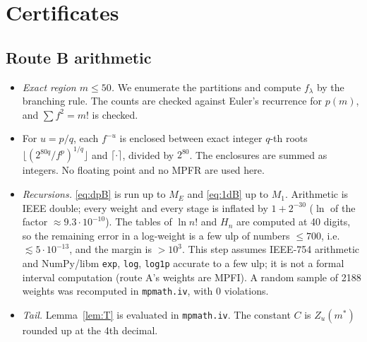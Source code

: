 \documentclass[11pt]{amsart}
\theoremstyle{remark}
\begin{document}
\section{Certificates}\label{sec:cert}

\subsection*{Route B arithmetic}
\begin{itemize}
\item \emph{Exact region $m\le50$.} We enumerate the partitions and compute $f_\lambda$ by the branching rule.
The counts are checked against Euler's recurrence for $p(m)$, and $\sum f^2=m!$ is checked.
\item For $u=p/q$, each $f^{-u}$ is enclosed between exact integer $q$-th roots
$\lfloor(2^{80q}/f^p)^{1/q}\rfloor$ and $\lceil\cdot\rceil$, divided by $2^{80}$. The enclosures are summed as
integers. No floating point and no MPFR are used here.
\item \emph{Recursions.} \eqref{eq:dpB} is run up to $M_E$ and \eqref{eq:1dB} up to $M_1$. Arithmetic is IEEE
double; every weight and every stage is inflated by $1+2^{-30}$ ($\ln$ of the factor $\approx9.3\cdot10^{-10}$). The tables of $\ln n!$ and $H_n$ are computed at 40 digits, so the remaining error in a log-weight is a few ulp of numbers $\le700$, i.e.\ $\lesssim5\cdot10^{-13}$, and the margin is $>10^3$. This step assumes IEEE-754 arithmetic and NumPy/libm \texttt{exp}, \texttt{log}, \texttt{log1p} accurate to a few ulp; it is not a formal interval computation (route A's weights are MPFI). A random sample of 2188 weights was recomputed in \texttt{mpmath.iv}, with
0 violations.
\item \emph{Tail.} Lemma~\ref{lem:T} is evaluated in \texttt{mpmath.iv}. The constant $C$ is $Z_u(m^*)$
rounded up at the 4th decimal.
\end{itemize}
\end{document}
